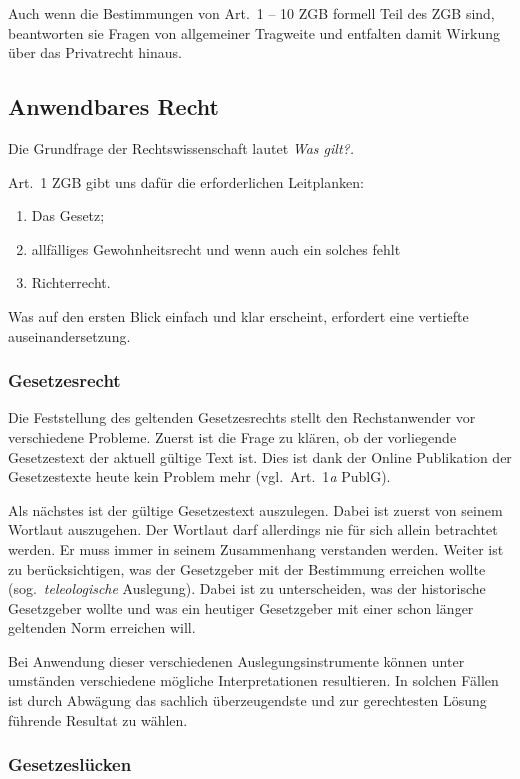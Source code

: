 Auch wenn die Bestimmungen von Art.\ 1 -- 10 ZGB formell Teil des ZGB
sind, beantworten sie Fragen von allgemeiner Tragweite\autocite[Seite
31]{tuor_schnyder} und entfalten damit Wirkung über das Privatrecht
hinaus\autocite[\S\ 3]{riemer_einleitungsartikel}.

\subsection{Anwendbares Recht}
Die Grundfrage der Rechtswissenschaft lautet \itshape \flqq Was
gilt?\frqq\normalfont.

Art.\ 1 ZGB gibt uns dafür die erforderlichen Leitplanken:

\begin{enumerate}
    \item Das Gesetz;
    \item allfälliges Gewohnheitsrecht und wenn auch ein solches fehlt
    \item Richterrecht\autocite[\S\ 4 N.\ 2]{riemer_einleitungsartikel}.
\end{enumerate}

Was auf den ersten Blick einfach und klar erscheint, erfordert eine
vertiefte auseinandersetzung.

\subsubsection{Gesetzesrecht}
Die Feststellung des geltenden Gesetzesrechts stellt den Rechstanwender
vor verschiedene Probleme. Zuerst ist die Frage zu klären, ob der
vorliegende Gesetzestext der aktuell gültige Text ist. Dies ist dank der
Online Publikation der Gesetzestexte heute kein Problem mehr (vgl.\
Art.\ 1\textit{a} PublG). 

Als nächstes ist der gültige Gesetzestext
auszulegen. Dabei ist zuerst von seinem Wortlaut auszugehen. Der
Wortlaut darf allerdings nie für sich allein betrachtet werden. Er muss
immer in seinem Zusammenhang verstanden werden\autocite[\S\ 4 N.\
35]{riemer_einleitungsartikel}. Weiter ist zu berücksichtigen, was der
Gesetzgeber mit der Bestimmung erreichen wollte (sog.\
\textit{teleologische} Auslegung). Dabei ist zu unterscheiden, was der
historische Gesetzgeber wollte und was ein heutiger Gesetzgeber mit
einer schon länger geltenden Norm erreichen will.

Bei Anwendung dieser verschiedenen Auslegungsinstrumente können unter
umständen verschiedene mögliche Interpretationen resultieren. In solchen
Fällen ist durch Abwägung das sachlich überzeugendste und zur
gerechtesten Lösung führende Resultat zu wählen\autocite[\S\ 4 N.\
59]{riemer_einleitungsartikel}.

\subsubsection{Gesetzeslücken}

